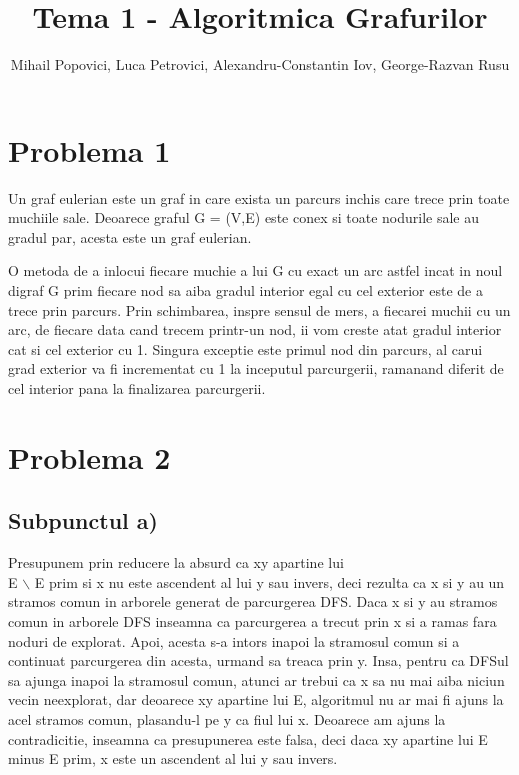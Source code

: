 \documentclass{article}
\title{Tema 1 - Algoritmica Grafurilor}
\author{Mihail Popovici, Luca Petrovici, Alexandru-Constantin Iov, George-Razvan Rusu}
\begin{document}
\maketitle

\section*{\fontsize{20}{50}\selectfont Problema 1}
{\fontsize{14}{16}\selectfont  Un graf eulerian este un graf in care exista un parcurs inchis care trece prin toate muchiile sale. Deoarece graful G = (V,E) este conex si toate nodurile sale au gradul par, acesta este un graf eulerian. 
\par O metoda de a inlocui fiecare muchie a lui G cu exact un arc astfel incat in noul digraf G prim fiecare nod sa aiba gradul interior egal cu cel exterior este de a trece prin parcurs. Prin schimbarea, inspre sensul de mers, a fiecarei muchii cu un arc, de fiecare data cand trecem printr-un nod, ii vom creste atat gradul interior cat si cel exterior cu 1. Singura exceptie este primul nod din parcurs, al carui grad exterior va fi incrementat cu 1 la inceputul parcurgerii, ramanand diferit de cel interior pana la finalizarea parcurgerii.}

\section*{\fontsize{20}{50}\selectfont Problema 2}
\subsection*{\fontsize{16}{30}\selectfont Subpunctul a)}
{\fontsize{14}{16}\selectfont  Presupunem prin reducere la absurd ca xy apartine lui  \\ E $\backslash$ E prim si x nu este ascendent al lui y sau invers, deci rezulta ca x si y au un stramos comun in arborele generat de parcurgerea DFS. Daca x si y au stramos comun in arborele DFS inseamna ca parcurgerea a trecut prin x si a ramas fara noduri de explorat. Apoi, acesta s-a intors inapoi la stramosul comun si a continuat parcurgerea din acesta, urmand sa treaca prin y. Insa, pentru ca DFSul sa ajunga inapoi la stramosul comun, atunci ar trebui ca x sa nu mai aiba niciun vecin neexplorat, dar deoarece xy apartine lui E, algoritmul nu ar mai fi ajuns la acel stramos comun, plasandu-l pe y ca fiul lui x. Deoarece am ajuns la contradicitie, inseamna ca presupunerea este falsa, deci daca xy apartine lui E minus E prim, x este un ascendent al lui y sau invers. }
\end{document}
